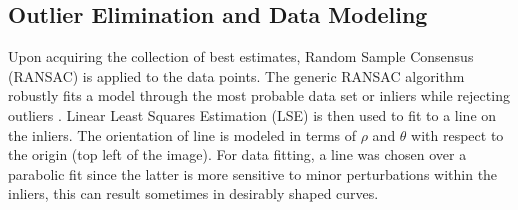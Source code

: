 \documentclass{article}
\begin{document}
\subsection{Outlier Elimination and Data Modeling}
Upon acquiring the collection of best estimates, Random Sample Consensus (RANSAC) is applied to the data points. The generic RANSAC algorithm robustly fits a model through the most probable data set or inliers while rejecting outliers \cite{hartley_multiple_2004,fischler_random_1981}. Linear Least Squares Estimation (LSE) is then used to fit to a line on the inliers. The orientation of line is modeled in terms of $\rho$ and $\theta$ with respect to the origin (top left of the image). For data fitting, a line was chosen over a parabolic fit since the latter is more sensitive to minor perturbations within the inliers, this can result sometimes in desirably shaped curves.\\
\end{document}
